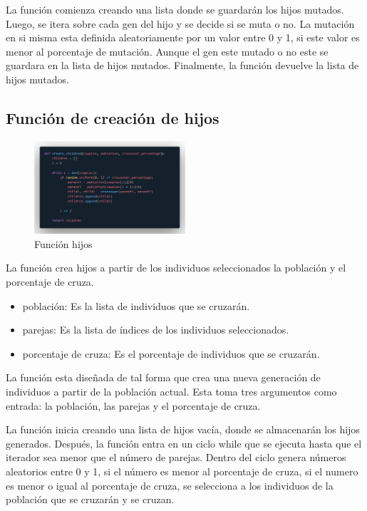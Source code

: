 \documentclass{report}
\begin{document}
    La función comienza creando una lista donde se guardarán los hijos mutados.
    Luego, se itera sobre cada gen del hijo y se decide si se muta o no.
    La mutación en si misma esta definida aleatoriamente por un valor entre 0 y 1, si este valor es menor al porcentaje de mutación.
    Aunque el gen este mutado o no este se guardara en la lista de hijos mutados.
    Finalmente, la función devuelve la lista de hijos mutados. 
    \newpage

    \subsection*{Función de creación de hijos}
    \begin{figure}[h]
        \centering
        \includegraphics[width=0.5\textwidth]{funcionSeleccion.png}
        \caption{Función hijos}
    \end{figure}

    La función crea hijos a partir de los individuos seleccionados la población y el porcentaje de cruza.

    \begin{itemize}
        \item población: Es la lista de individuos que se cruzarán.
        \item parejas: Es la lista de índices de los individuos seleccionados.
        \item porcentaje de cruza: Es el porcentaje de individuos que se cruzarán.
    \end{itemize}

    La función esta diseñada de tal forma que crea una nueva generación de individuos 
    a partir de la población actual.
    Esta toma tres argumentos como entrada: la población, las parejas y el porcentaje de cruza.

    La función inicia creando una lista de hijos vacía, donde se almacenarán los hijos generados.
    Después, la función entra en un ciclo while que se ejecuta hasta que el iterador sea menor que el número de parejas.
    Dentro del ciclo genera números aleatorios entre 0 y 1, si el número es menor al porcentaje de cruza, si el numero es menor o igual
    al porcentaje de cruza, se selecciona a los individuos de la población que se cruzarán y se cruzan.
\end{document}

